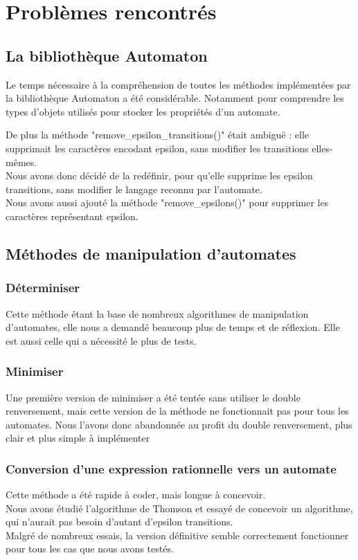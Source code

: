 \documentclass[a4paper, 12pt]{report}
\begin{document}
\newpage
\section{Problèmes rencontrés}
\subsection{La bibliothèque Automaton}
Le temps nécessaire à la compréhension de toutes les méthodes implémentées par la bibliothèque Automaton a été considérable. Notamment pour comprendre les types d'objets utilisés pour stocker les propriétés d'un automate.

De plus la méthode "remove\_epsilon\_transitions()" était ambiguë : elle supprimait les caractères encodant epsilon, sans modifier les transitions elles-mêmes.\\
Nous avons donc décidé de la redéfinir, pour qu'elle supprime les epsilon transitions, sans modifier le langage reconnu par l'automate.\\
Nous avons aussi ajouté la méthode "remove\_epsilons()" pour supprimer les caractères représentant epsilon.


\subsection{Méthodes de manipulation d'automates}
\subsubsection{Déterminiser}
Cette méthode étant la base de nombreux algorithmes de manipulation d'automates, elle nous a demandé beaucoup plus de temps et de réflexion. Elle est aussi celle qui a nécessité le plus de tests.

\subsubsection{Minimiser}
Une première version de minimiser a été tentée sans utiliser le double renversement, mais cette version de la méthode ne fonctionnait pas pour tous les automates. Nous l'avons donc abandonnée au profit du double renversement, plus clair et plus simple à implémenter

\subsubsection{Conversion d'une expression rationnelle vers un automate}
Cette méthode a été rapide à coder, mais longue à concevoir.\\
Nous avons étudié l'algorithme de Thomson et essayé de concevoir un algorithme, qui n'aurait pas besoin d'autant d'epsilon transitions.\\
Malgré de nombreux essais, la version définitive semble correctement fonctionner pour tous les cas que nous avons testés.
\end{document}
